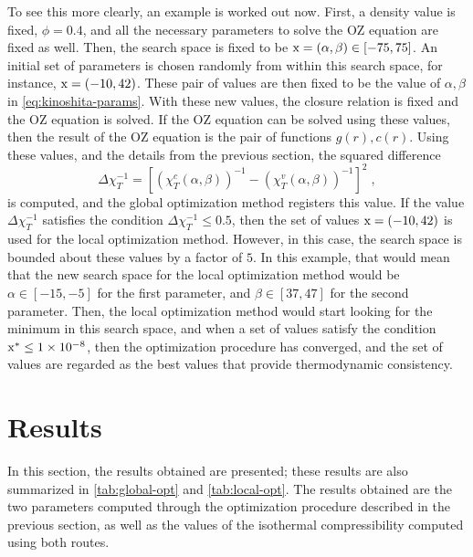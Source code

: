 To see this more clearly, an example is worked out now. First, a density value is fixed, 
\(\phi = 0.4\), and all the necessary parameters to solve the OZ equation are fixed as 
well. Then, the search space is fixed to be \(\rm{x} = \left(\alpha, \beta\right) \in \left[-75, 75\right]\). 
An initial set of parameters is chosen randomly from within this search space, for 
instance, \(\rm{x} = \left(-10, 42\right)\). These pair of values are then fixed to be the 
value of \(\alpha, \beta\) in \autoref{eq:kinoshita-params}. With these new values, the 
closure relation is fixed and the OZ equation is solved. If the OZ equation can be solved 
using these values, then the result of the OZ equation is the pair of functions 
\(g(r), c(r)\). Using these values, and the details from the previous section, the squared 
difference 
\[
    \Delta \chi^{-1}_{T} = {\left[ {\left(\chi_{T}^{c} \left(\alpha, \beta\right) \right)}^{-1} - {\left(\chi_{T}^{v} \left(\alpha, \beta\right) \right)}^{-1} \right]}^2 
\; ,
\] 
is computed, and the global optimization method registers this value. If the value 
\(\Delta \chi^{-1}_{T}\) satisfies the condition \(\Delta \chi^{-1}_{T} \leq 0.5\), then 
the set of values \(\rm{x} = \left(-10, 42\right)\) is used for the local optimization 
method. However, in this case, the search space is bounded about these values by a factor 
of \(5\). In this example, that would mean that the new search space for the local 
optimization method would be \(\alpha \in [-15, -5]\) for the first parameter, and 
\(\beta \in [37, 47]\) for the second parameter. Then, the local optimization method would 
start looking for the minimum in this search space, and when a set of values satisfy the 
condition \(\rm{x}^{*} \leq \num{1e-8}\), then the optimization procedure has converged, 
and the set of values are regarded as the best values that provide thermodynamic 
consistency.

\section{Results}
In this section, the results obtained are presented; these results are also summarized in \autoref{tab:global-opt} and \autoref{tab:local-opt}. The results obtained are the two parameters computed through the optimization procedure described in the previous section, as well as the values of the isothermal compressibility computed using both routes.

